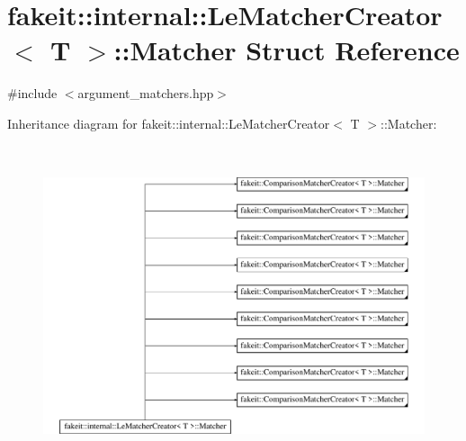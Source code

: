 \hypertarget{structfakeit_1_1internal_1_1LeMatcherCreator_1_1Matcher}{}\section{fakeit\+::internal\+::Le\+Matcher\+Creator$<$ T $>$\+::Matcher Struct Reference}
\label{structfakeit_1_1internal_1_1LeMatcherCreator_1_1Matcher}


{\ttfamily \#include $<$argument\+\_\+matchers.\+hpp$>$}

Inheritance diagram for fakeit\+::internal\+::Le\+Matcher\+Creator$<$ T $>$\+::Matcher\+:\begin{figure}[H]
\begin{center}
\leavevmode
\includegraphics[height=9.427609cm]{structfakeit_1_1internal_1_1LeMatcherCreator_1_1Matcher}
\end{center}
\end{figure}
